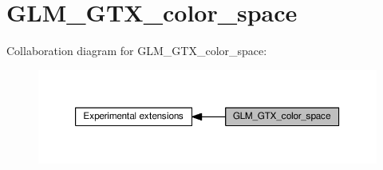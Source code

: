 \hypertarget{group__gtx__color__space}{}\section{G\+L\+M\+\_\+\+G\+T\+X\+\_\+color\+\_\+space}
\label{group__gtx__color__space}
Collaboration diagram for G\+L\+M\+\_\+\+G\+T\+X\+\_\+color\+\_\+space\+:
\nopagebreak
\begin{figure}[H]
\begin{center}
\leavevmode
\includegraphics[width=350pt]{d3/dd0/group__gtx__color__space}
\end{center}
\end{figure}
